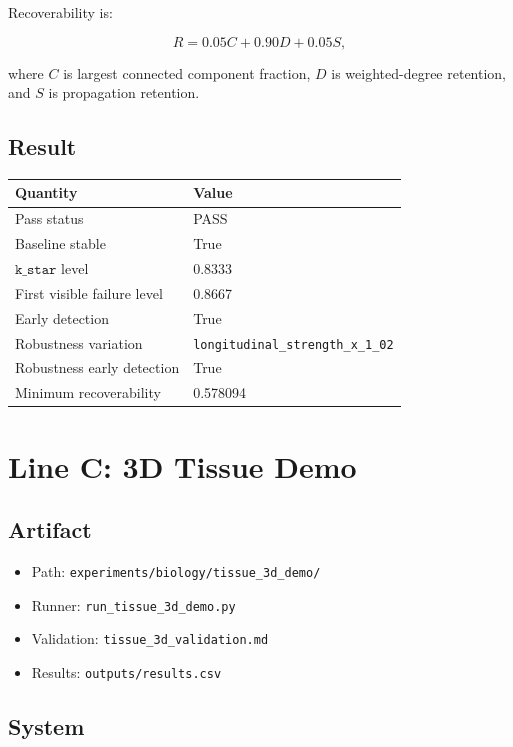 \documentclass[11pt]{article}
\begin{document}
Recoverability is:

\[
R=0.05C+0.90D+0.05S,
\]

where \(C\) is largest connected component fraction, \(D\) is weighted-degree retention, and \(S\) is propagation retention.

\subsection{Result}

\begin{center}
\begin{tabular}{ll}
\toprule
Quantity & Value \\
\midrule
Pass status & PASS \\
Baseline stable & True \\
\(\texttt{k\_star}\) level & 0.8333 \\
First visible failure level & 0.8667 \\
Early detection & True \\
Robustness variation & \texttt{longitudinal\_strength\_x\_1\_02} \\
Robustness early detection & True \\
Minimum recoverability & 0.578094 \\
\bottomrule
\end{tabular}
\end{center}

\section{Line C: 3D Tissue Demo}

\subsection{Artifact}

\begin{itemize}
\item Path: \texttt{experiments/biology/tissue\_3d\_demo/}
\item Runner: \texttt{run\_tissue\_3d\_demo.py}
\item Validation: \texttt{tissue\_3d\_validation.md}
\item Results: \texttt{outputs/results.csv}
\end{itemize}

\subsection{System}
\end{document}
